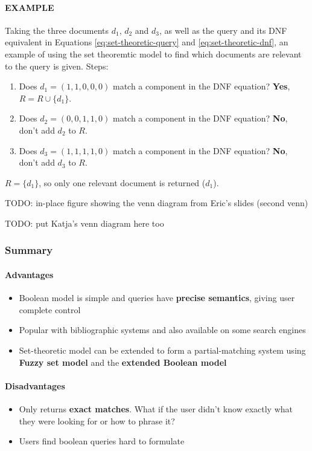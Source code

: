 \documentclass{article}
\begin{document}
\paragraph{\textbf{EXAMPLE}} Taking the three documents $d_1$, $d_2$ and $d_3$, as well as the query and its DNF equivalent in Equations \ref{eq:set-theoretic-query} and \ref{eq:set-theoretic-dnf}, an example of using the set theoremtic model to find which documents are relevant to the query is given. Steps:
\begin{enumerate}
	\item Does $d_1 = (1, 1, 0, 0, 0)$ match a component in the DNF equation? \textbf{Yes}, $R = R \cup \lbrace d_1 \rbrace$.
	\item Does $d_2 = (0, 0, 1, 1, 0)$ match a component in the DNF equation? \textbf{No}, don't add $d_2$ to $R$.
	\item Does $d_3 = (1, 1, 1, 1, 0)$ match a component in the DNF equation? \textbf{No}, don't add $d_3$ to $R$.
\end{enumerate}
$R =  \lbrace d_1 \rbrace$, so only one relevant document is returned ($d_1$).

TODO: in-place figure showing the venn diagram from Eric's slides (second venn)

TODO: put Katja's venn diagram here too

\subsubsection{Summary}

\paragraph{\textbf{Advantages}}
\begin{itemize}
	\item Boolean model is simple and queries have \textbf{precise semantics}, giving user complete control
	\item Popular with bibliographic systems and also available on some search engines
	\item Set-theoretic model can be extended to form a partial-matching system using \textbf{Fuzzy set model} and the \textbf{extended Boolean model}
\end{itemize}
\paragraph{\textbf{Disadvantages}}
\begin{itemize}
	\item Only returns \textbf{exact matches}. What if the user didn't know exactly what they were looking for or how to phrase it?
	\item Users find boolean queries hard to formulate
\end{itemize}
\end{document}
